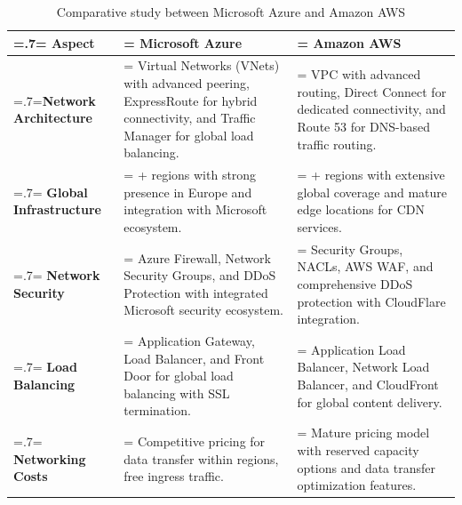\begin{table}[H]
    \renewcommand{\arraystretch}{1.5}%
    \caption{Comparative study between Microsoft Azure and Amazon AWS}
    \centering
    \medskip
    \begin{tabularx}{1\textwidth} {
            | >{\hsize=.7\hsize\linewidth=\hsize\centering\arraybackslash}X
            | >{\hsize=1.15\hsize\linewidth=\hsize\justifying\arraybackslash}X
            | >{\hsize=1.15\hsize\linewidth=\hsize\justifying\arraybackslash}X |}
        \hline
        \rowcolor{primary} \textbf {Aspect} & \textbf {Microsoft Azure}                                                                                                                      & \textbf {Amazon AWS}                                                                                                        \\
        \hline
        \textbf {Network Architecture}      & \noindent Virtual Networks (VNets) with advanced peering, ExpressRoute for hybrid connectivity, and Traffic Manager for global load balancing. & \noindent VPC with advanced routing, Direct Connect for dedicated connectivity, and Route 53 for DNS-based traffic routing. \\
        \hline
        \textbf {Global Infrastructure}     & \noindent 60+ regions with strong presence in Europe and integration with Microsoft ecosystem.                                                 & \noindent 80+ regions with extensive global coverage and mature edge locations for CDN services.                            \\
        \hline
        \textbf {Network Security}          & \noindent Azure Firewall, Network Security Groups, and DDoS Protection with integrated Microsoft security ecosystem.                           & \noindent Security Groups, NACLs, AWS WAF, and comprehensive DDoS protection with CloudFlare integration.                   \\
        \hline
        \textbf {Load Balancing}            & \noindent Application Gateway, Load Balancer, and Front Door for global load balancing with SSL termination.                                   & \noindent Application Load Balancer, Network Load Balancer, and CloudFront for global content delivery.                     \\
        \hline
        \textbf {Networking Costs}          & \noindent Competitive pricing for data transfer within regions, free ingress traffic.                                                          & \noindent Mature pricing model with reserved capacity options and data transfer optimization features.                      \\
        \hline
    \end{tabularx}
\end{table}

